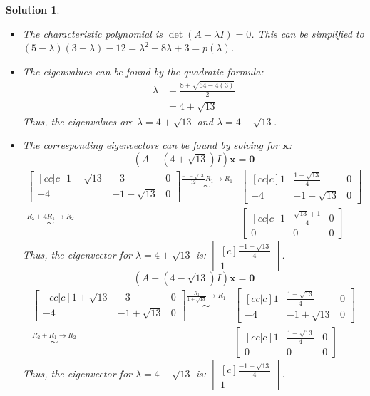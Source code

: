 \documentclass[11pt]{scrartcl}
\theoremstyle{dotlessP}
\newtheorem{sol}{Solution}[section]
\theoremstyle{dotlessN}
\begin{document}
\begin{sol} \
	\begin{itemize} 
		\item The characteristic polynomial is $\det(A - \lambda I) = 0$. This can be simplified to  $(5-\lambda)(3-\lambda) - 12 = \lambda^2 - 8 \lambda + 3 = p(\lambda)$.
		\item The eigenvalues can be found by the quadratic formula:
			\begin{align*}
				\lambda &= \frac{8 \pm \sqrt{64 - 4(3)}}{2} \\
						&= 4 \pm \sqrt{13}
			\end{align*}
			Thus, the eigenvalues are $\lambda = 4 + \sqrt{13}$ and $\lambda = 4 - \sqrt{13}$.
		\item The corresponding eigenvectors can be found by solving for $\bm{x}$:
			\[
				(A - (4+\sqrt{13})I)\bm{x} = \bm{0}
			\] 
			\begin{align*}
				\begin{bmatrix}[cc|c]
					1 - \sqrt{13} & -3 & 0 \\
					-4 & -1 - \sqrt{13} & 0
				\end{bmatrix} \stackrel{\frac{-1-\sqrt{13}}{12}R_1 \to R_1}{\sim}
				&\begin{bmatrix}[cc|c]
					1 & \frac{1+\sqrt{13}}{4} & 0 \\
					-4 & -1 - \sqrt{13} & 0
				\end{bmatrix} \\
				\stackrel{R_2 + 4R_1 \to R_2}{\sim}
				&\begin{bmatrix}[cc|c]
					1 & \frac{\sqrt{13} + 1}{4} & 0 \\
					0 & 0 & 0 
				\end{bmatrix}
			\end{align*}
			Thus, the eigenvector for $\lambda = 4 + \sqrt{13}$ is: 
			$
			\begin{bmatrix}[c]
				\frac{- 1 - \sqrt{13}}{4} \\
				1
			\end{bmatrix}
			$.
\[
	(A - (4 - \sqrt{13})I)\bm{x} = \bm{0}
\] 
\begin{align*}
	\begin{bmatrix}[cc|c]
		1 + \sqrt{13} & -3 & 0\\
		-4 & -1 + \sqrt{13} & 0
	\end{bmatrix} \stackrel{\frac{R_1}{1 + \sqrt{13}} \to R_1}{\sim} 
	&\begin{bmatrix}[cc|c]
		1 & \frac{1 - \sqrt{13}}{4} & 0 \\
		-4 & -1 + \sqrt{13} & 0 
	\end{bmatrix} \\
	\stackrel{R_2 + R_1 \to R_2}{\sim}
	&\begin{bmatrix}[cc|c]
		1 & \frac{1-\sqrt{13}}{4} & 0 \\
		0 & 0 & 0
	\end{bmatrix}
\end{align*}
Thus, the eigenvector for $\lambda = 4 - \sqrt{13}$ is:
$
\begin{bmatrix}[c]
	\frac{-1+\sqrt{13}}{4} \\
	1
\end{bmatrix}
$.
	\end{itemize}
\end{sol}
\end{document}
